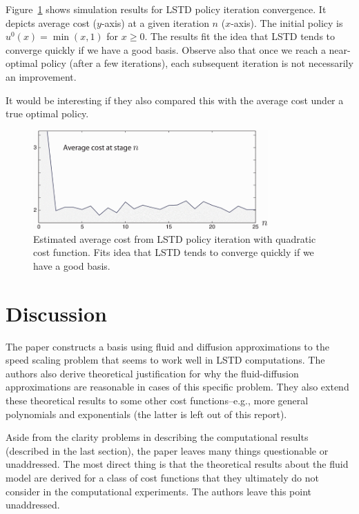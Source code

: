 \documentclass[11pt]{article}
\begin{document}
Figure~\ref{fig:PIA_converge} shows simulation results for LSTD policy iteration convergence. It depicts average cost ($y$-axis) at a given iteration $n$ ($x$-axis). The initial policy is $u^0(x) = \min (x,1)$ for $x\geq 0$. The results fit the idea that LSTD tends to converge quickly if we have a good basis. Observe also that once we reach a near-optimal policy (after a few iterations), each subsequent iteration is not necessarily an improvement.

It would be interesting if they also compared this with the average cost under a true optimal policy.

\begin{center}
\begin{figure}
\includegraphics[width=9cm]{lstd_converge}
\caption{Estimated average cost from LSTD policy iteration with quadratic cost function. Fits idea that LSTD tends to converge quickly if we have a good basis.}\label{fig:PIA_converge}
\end{figure}
\end{center}






\section{Discussion} \label{sec:discussion}

The paper constructs a basis using fluid and diffusion approximations to the speed scaling problem that seems to work well in LSTD computations. The authors also derive theoretical justification for why the fluid-diffusion approximations are reasonable in cases of this specific problem. They also extend these theoretical results to some other cost functions--e.g., more general polynomials and exponentials (the latter is left out of this report).

Aside from the clarity problems in describing the computational results (described in the last section), the paper leaves many things questionable or unaddressed. The most direct thing is that the theoretical results about the fluid model are derived for a class of cost functions that they ultimately do not consider in the computational experiments. The authors leave this point unaddressed.
\end{document}
